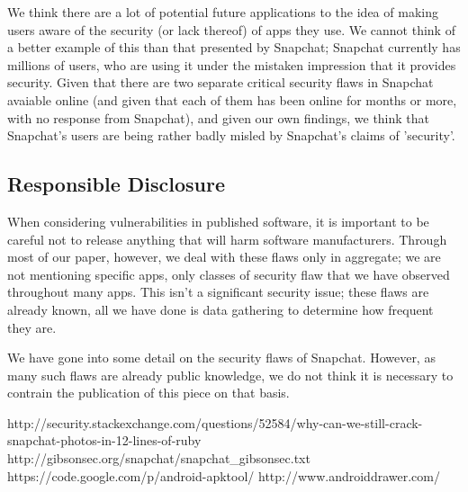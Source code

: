 \documentclass[11pt]{article}
\numberwithin{theorem}{subsection}
\begin{document}
We think there are a lot of potential future applications to the idea of making users aware of the security (or lack thereof) of apps they use.  We
cannot think of a better example of this than that presented by Snapchat; Snapchat currently has millions of users, who are using it under the
mistaken impression that it provides security.  Given that there are two separate critical security flaws in Snapchat avaiable online (and given that
each of them has been online for months or more, with no response from Snapchat), and given our own findings, we think that Snapchat's users are being
rather badly misled by Snapchat's claims of 'security'.

\subsection{Responsible Disclosure}

When considering vulnerabilities in published software, it is important to be careful not to release anything that will harm software manufacturers.
Through most of our paper, however, we deal with these flaws only in aggregate; we are not mentioning specific apps, only classes of security
flaw that we have observed throughout many apps.  This isn't a significant security issue; these flaws are already known, all we have done is
data gathering to determine how frequent they are.

We have gone into some detail on the security flaws of Snapchat.  However, as many such flaws are already public knowledge\cite{1}\cite{2}, we do
not think it is necessary to contrain the publication of this piece on that basis.

\begin{thebibliography}{9}

        http://security.stackexchange.com/questions/52584/why-can-we-still-crack-snapchat-photos-in-12-lines-of-ruby
        http://gibsonsec.org/snapchat/snapchat\_gibsonsec.txt
        https://code.google.com/p/android-apktool/
        http://www.androiddrawer.com/

\end{thebibliography}
\end{document}
